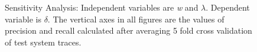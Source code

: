 \begin{figure}
    \centering
    \qquad
    \caption{Sensitivity Analysis: Independent variables are \textit{w} and $\lambda$. Dependent variable is $\delta$. The vertical axes in all figures are the values of precision and recall calculated after averaging 5 fold cross validation of test system traces.}%
    \label{fig:sensitivityAnalysis_2}%
\end{figure}

